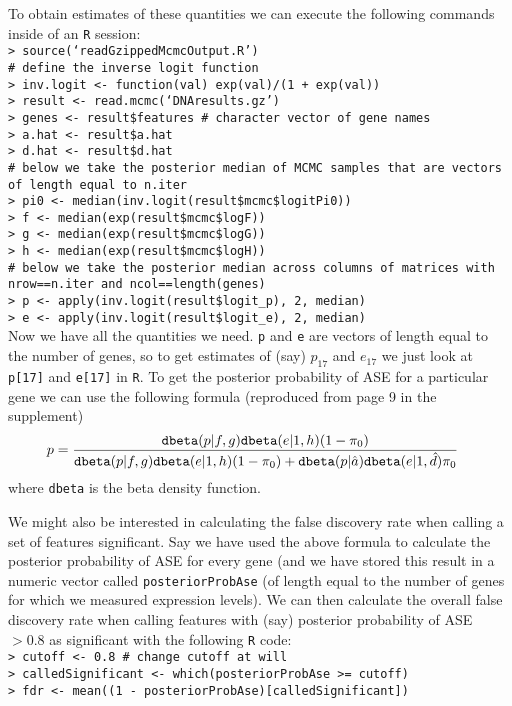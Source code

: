 \documentclass[12pt,]{article}
\begin{document}
To obtain estimates of these quantities we can execute the following commands inside 
of an {\tt R} session: \\
{\tt > source(`readGzippedMcmcOutput.R') \\
\# define the inverse logit function \\
> inv.logit <- function(val) exp(val)/(1 + exp(val)) \\
> result <- read.mcmc(`DNAresults.gz') \\
> genes <- result\$features \qquad \# character vector of gene names\\
> a.hat <- result\$a.hat \\
> d.hat <- result\$d.hat \\
\# below we take the posterior median of MCMC samples that are vectors of length 
equal to n.iter \\
> pi0 <- median(inv.logit(result\$mcmc\$logitPi0)) \\
> f <- median(exp(result\$mcmc\$logF)) \\
> g <- median(exp(result\$mcmc\$logG)) \\
> h <- median(exp(result\$mcmc\$logH)) \\
\# below we take the posterior median across columns of matrices with nrow==n.iter and 
ncol==length(genes) \\
> p <- apply(inv.logit(result\$logit\_p), 2, median) \\
> e <- apply(inv.logit(result\$logit\_e), 2, median)
} \\

Now we have all the quantities we need. {\tt p} and {\tt e} are vectors of length equal to
the number of genes, so to get estimates of (say) $p_{17}$ and $e_{17}$ we just look at
{\tt p[17]} and {\tt e[17]} in {\tt R}. To get the posterior probability of ASE for a particular gene
we can use the following formula (reproduced from page 9 in the supplement)
\begin{align*}
p &= \frac{\mbox{\tt dbeta}(p | f, g) \mbox{\tt dbeta}(e | 1, h) (1 - \pi_0)}
	{\mbox{\tt dbeta}(p | f, g) \mbox{\tt dbeta}(e | 1, h) (1 - \pi_0) + \mbox{\tt dbeta}(p | \hat{a}) \mbox{\tt dbeta}(e | 1, \hat{d}) \pi_0}
\end{align*}
where {\tt dbeta} is the beta density function.

We might also be interested in calculating the false discovery rate when calling a set of 
features significant. Say we have used the above formula to calculate the posterior
probability of ASE for every gene (and we have stored this result in a numeric vector 
called {\tt posteriorProbAse} (of length equal to the number of genes for which we
measured expression levels). We can then calculate the overall false discovery rate
when calling features with (say) posterior probability of ASE $> 0.8$ as significant with the 
following
{\tt R} code: \\
{\tt > cutoff <- 0.8 \qquad \# change cutoff at will\\
> calledSignificant <- which(posteriorProbAse >= cutoff) \\
> fdr <- mean((1 - posteriorProbAse)[calledSignificant]) \\
} \\
\end{document}
